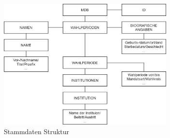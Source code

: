 \begin{figure}[H]
    \centering
    \includegraphics[width=3.5in]{images/02-Crawler/stammdaten_struktur.png}
    \caption{Stammdaten Struktur}
    \label{fig:stammdatenStruktur}
\end{figure}


